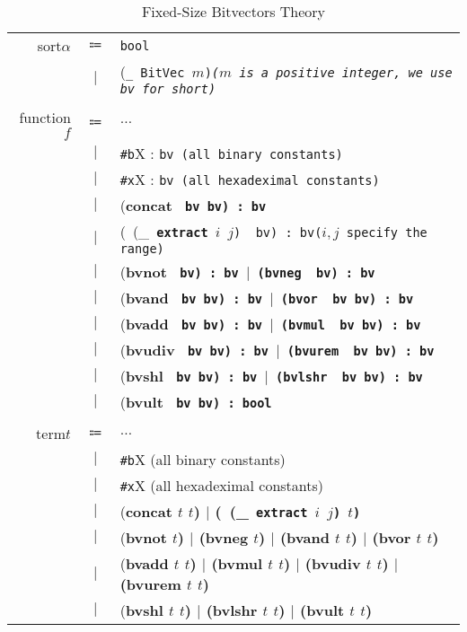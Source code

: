 \documentclass[11pt,letter]{article}
\theoremstyle{definition}
\begin{document}
\begin{table}[h]
\begin{mdframed}
\centering
\begin{tabular}{r c l}
sort\qquad $\alpha$ & $\Coloneqq$ & \tt bool \\
& $\mid$ & \rm(\tt \_\ BitVec $m$\rm)\it\qquad \rm($m$ \rm is a positive integer, we use {\tt bv} for short)\\
\\
function\qquad $f$ & $\Coloneqq$ & $\ldots$ \\
& $\mid$ & {\tt \#b}X \rm : \tt bv \rm\qquad (all binary constants)\\
& $\mid$ & {\tt \#x}X \rm : \tt bv \rm\qquad (all hexadeximal constants)\\
& $\mid$ & (\bf concat \tt\ bv bv\rm) : \tt bv \\
& $\mid$ & \rm(\ (\_\tt\ {\bf extract}\ $i$\ $j$\rm) \tt\ bv\rm) : \tt bv\rm\qquad ($i, j$ specify the range)\\
& $\mid$ & (\bf bvnot \tt\ bv\rm) : \tt bv \rm$\mid$ (\bf bvneg \tt\ bv\rm) : \tt bv \\
& $\mid$ & (\bf bvand \tt\ bv bv\rm) : \tt bv \rm$\mid$ (\bf bvor \tt\ bv bv\rm) : \tt bv \\
& $\mid$ & (\bf bvadd \tt\ bv bv\rm) : \tt bv \rm$\mid$ (\bf bvmul \tt\ bv bv\rm) : \tt bv \\
& $\mid$ & (\bf bvudiv \tt\ bv bv\rm) : \tt bv \rm$\mid$ (\bf bvurem \tt\ bv bv\rm) : \tt bv \\
& $\mid$ & (\bf bvshl \tt\ bv bv\rm) : \tt bv \rm$\mid$ (\bf bvlshr \tt\ bv bv\rm) : \tt bv \\
& $\mid$ & (\bf bvult \tt\ bv bv\rm) : \tt bool \\
\\
term\qquad $t$ & $\Coloneqq$ & $\ldots$ \\
& $\mid$ & {\tt \#b}X \rm\qquad (all binary constants)\\
& $\mid$ & {\tt \#x}X \rm\qquad (all hexadeximal constants)\\
& $\mid$ & (\bf concat \rm $t$ $t$) $\mid$ (\ (\_\tt\ {\bf extract} \rm $i$ $j$)\ $t$)\\ 
& $\mid$ & (\bf bvnot \rm $t$) $\mid$ (\bf bvneg \rm $t$) $\mid$ (\bf bvand \rm $t$ $t$) $\mid$ (\bf bvor \rm $t$ $t$)\\
& $\mid$ & (\bf bvadd \rm $t$ $t$) $\mid$ (\bf bvmul \rm $t$ $t$) $\mid$ (\bf bvudiv \rm $t$ $t$) $\mid$ (\bf bvurem \rm $t$ $t$)\\
& $\mid$ & (\bf bvshl \rm $t$ $t$) $\mid$ (\bf bvlshr \rm $t$ $t$) $\mid$ (\bf bvult \rm $t$ $t$) \\
\end{tabular}
\end{mdframed}
\caption{Fixed-Size Bitvectors Theory}
\end{table}
\end{document}
